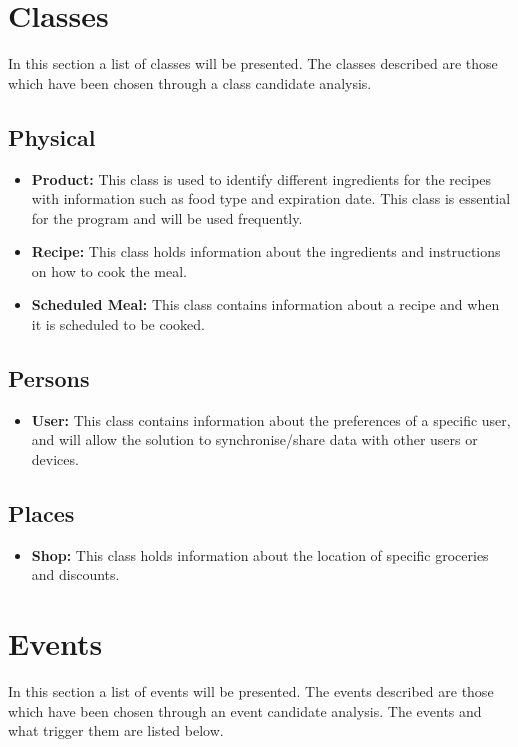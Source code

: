 \section{Classes}
In this section a list of classes will be presented. The classes described are those which have been chosen through a class candidate analysis.

\subsection{Physical}
\begin{itemize}
\item \textbf{Product:} This class is used to identify different ingredients for the recipes with information such as food type and expiration date. This class is essential for the program and will be used frequently.
\item \textbf{Recipe:} This class holds information about the ingredients and instructions on how to cook the meal.
\item \textbf{Scheduled Meal:} This class contains information about a recipe and when it is scheduled to be cooked.
\end{itemize}

\subsection{Persons}
\begin{itemize}
\item \textbf{User:} This class contains information about the preferences of a specific user, and will allow the solution to synchronise/share data with other users or devices.
\end{itemize}

\subsection{Places}
\begin{itemize}
\item \textbf{Shop:} This class holds information about the location of specific groceries and discounts.
\end{itemize}

\section{Events}
In this section a list of events will be presented. The events described are those which have been chosen through an event candidate analysis. The events and what trigger them are listed below.
